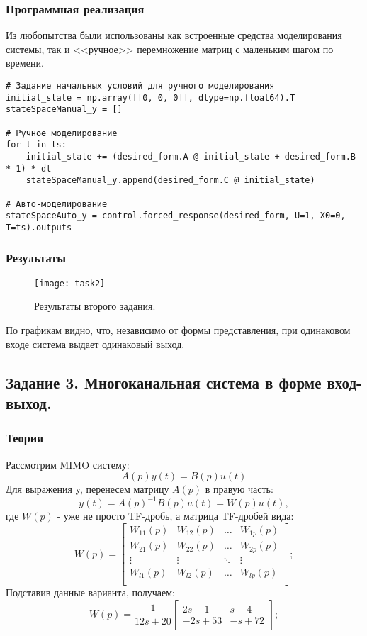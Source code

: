 \documentclass[16pt]{article}
\begin{document}
\subsubsection{Программная реализация}
Из любопытства были использованы как встроенные средства моделирования системы, так и <<ручное>> перемножение матриц с маленьким шагом по времени.
\begin{verbatim}
# Задание начальных условий для ручного моделирования
initial_state = np.array([[0, 0, 0]], dtype=np.float64).T
stateSpaceManual_y = []

# Ручное моделирование
for t in ts:
    initial_state += (desired_form.A @ initial_state + desired_form.B * 1) * dt
    stateSpaceManual_y.append(desired_form.C @ initial_state)

# Авто-моделирование
stateSpaceAuto_y = control.forced_response(desired_form, U=1, X0=0, T=ts).outputs
\end{verbatim}

\subsubsection{Результаты}
\begin{figure}[H]
	\centering
	\texttt{[image: task2]}
	\caption{Результаты второго задания.}
	\label{fig:fig2}
\end{figure}
По графикам видно, что, независимо от формы представления, при одинаковом входе система выдает одинаковый выход.

\newpage
\subsection{Задание 3. Многоканальная система в форме вход-выход.}
\subsubsection{Теория}
Рассмотрим MIMO систему:
\[ 
    A(p)y(t) = B(p)u(t)
\]
Для выражения y, перенесем матрицу \(A(p)\) в правую часть:
\[
    y(t) = A(p)^{-1}B(p)u(t) = W(p)u(t),
\]
где \(W(p)\) - уже не просто TF-дробь, а матрица TF-дробей вида:
\[
    W(p) = \begin{bmatrix}
        W_{11}(p) & W_{12}(p) & \hdots & W_{1p}(p)\\
        W_{21}(p) & W_{22}(p) & \hdots & W_{2p}(p)\\
        \vdots & \vdots & \ddots & \vdots \\
        W_{l1}(p) & W_{l2}(p) & \hdots & W_{lp}(p)\\
        \end{bmatrix};
\]
Подставив данные варианта, получаем:
\[
    W(p) = \frac{1}{12s+20}\begin{bmatrix}
        2s - 1 & s - 4 \\
        -2s + 53 & -s + 72
        \end{bmatrix};
\]
\end{document}
